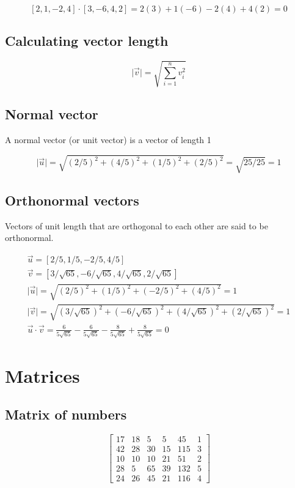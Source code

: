 \documentclass[a4paper, 12pt]{article}
\begin{document}
\[
[2, 1, -2, 4] \cdot [3, -6, 4, 2] = 2(3) + 1(-6) - 2(4) + 4(2) = 0
\]

\subsection{Calculating vector length}

\[
{\lvert}\vec{v}{\rvert} = \sqrt{ \sum_{i=1}^{n}{v_i^2} }
\]

\subsection{Normal vector}

A normal vector (or unit vector) is a vector of length 1

\[
{\lvert}\vec{u}{\rvert} = \sqrt{(2/5)^2 + (4/5)^2 + (1/5)^2 + (2/5)^2} = \sqrt{25/25} = 1
\]

\subsection{Orthonormal vectors}

Vectors of unit length that are orthogonal to each other are said to be orthonormal.

\begin{gather}
\vec{u} = [2/5, 1/5, -2/5, 4/5] \\
\vec{v} = [3 / \sqrt{65}, -6 / \sqrt{65}, 4 / \sqrt{65}, 2 / \sqrt{65}] \\
{\lvert}\vec{u}\rvert = \sqrt{(2/5)^2 + (1/5)^2 + (-2/5)^2 + (4/5)^2} = 1 \\
{\lvert}\vec{v}\rvert = \sqrt{(3 / \sqrt{65})^2 + (-6 / \sqrt{65})^2 + (4 / \sqrt{65})^2 + (2 / \sqrt{65})^2} = 1 \\
\vec{u} \cdot \vec{v} = \frac{6}{5\sqrt{65}} - \frac{6}{5\sqrt{65}} - \frac{8}{5\sqrt{65}} + \frac{8}{5\sqrt{65}} = 0
\end{gather}

\section{Matrices}

\subsection{Matrix of numbers}

\[
\begin{bmatrix}
17 & 18 & 5 & 5 & 45 & 1 \\
42 & 28 & 30 & 15 & 115 & 3 \\
10 & 10 & 10 & 21 & 51 & 2 \\
28 & 5 & 65 & 39 & 132 & 5 \\
24 & 26 & 45 & 21 & 116 & 4
\end{bmatrix}
\]
\end{document}
